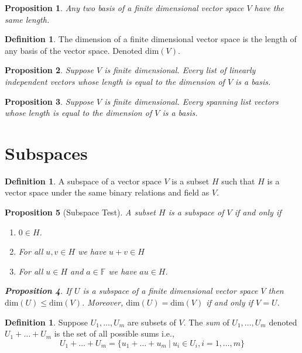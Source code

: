 \documentclass[12pt,letterpaper]{amsart}
\theoremstyle{plain}
\newtheorem{proposition}{Proposition}[section]
\theoremstyle{definition}
\newtheorem{definition}[theorem]{Definition}
\numberwithin{equation}{section}
\begin{document}
\begin{proposition} Any two basis of a finite dimensional vector space $V$ have the same length. 
\end{proposition}

\begin{definition} The dimension of a finite dimensional vector space is the length of any basis of the vector space. Denoted $\text{dim}(V)$. 
\end{definition}

\begin{proposition} Suppose $V$ is finite dimensional. Every list of linearly independent vectors whose length is equal to the dimension of $V$ is a basis. 
\end{proposition}

\begin{proposition} Suppose $V$ is finite dimensional. Every spanning list vectors whose length is equal to the dimension of $V$ is a basis. 
\end{proposition}

\section{Subspaces}
\begin{definition} A subspace of a vector space $V$ is a subset $H$ such that $H$ is a vector space under the same binary relations and field as $V$. 
\end{definition}

\begin{proposition}[Subspace Test] A subset $H$ is a subspace of $V$ if and only if 
\begin{enumerate}[1.] 
\item $0\in H$. 
\item For all $u,v\in H$ we have $u+v\in H$
\item For all $u\in H$ and $a\in \mathbb{F}$ we have $au\in H$.
\end{enumerate}

\begin{proposition} If $U$ is a subspace of a finite dimensional vector space $V$ then $\text{dim}(U)\leq\text{dim}(V)$. Moreover, $\text{dim}(U)=\text{dim}(V)$ if and only if $V=U$. 
\end{proposition}

\end{proposition}
\begin{definition} Suppose $U_1,\ldots, U_m$ are subsets of $V$. The \emph{sum} of $U_1, \ldots, U_m$ denoted $U_1+\ldots+U_m$ is the set of all possible sums i.e., 
\[U_1+\ldots+U_m=\{u_1+\ldots+u_m\ |\ u_i\in U_i, i=1,\ldots, m\}\]
\end{definition}
\end{document}
